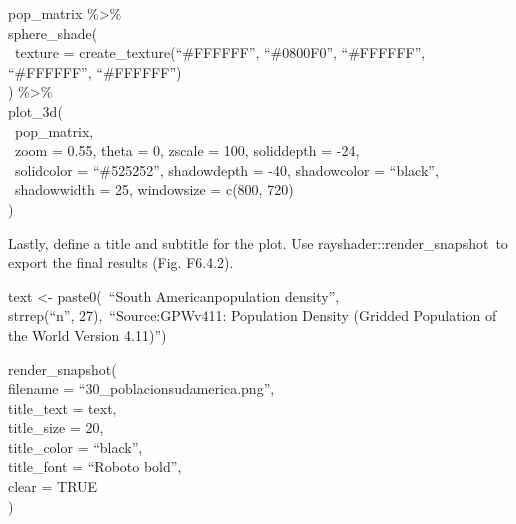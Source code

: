 \documentclass[
  letterpaper,
  DIV=11,
  numbers=noendperiod]{scrreprt}
\begin{document}
pop\_matrix \%\textgreater\%\\
\hspace*{0.333em}sphere\_shade(\\
\hspace*{0.333em} ~texture = create\_texture(``\#FFFFFF'', ``\#0800F0'',
``\#FFFFFF'', ``\#FFFFFF'', ``\#FFFFFF'')\\
\hspace*{0.333em}) \%\textgreater\%\\
\hspace*{0.333em}plot\_3d(\\
\hspace*{0.333em} ~pop\_matrix,\\
\hspace*{0.333em} ~zoom = 0.55, theta = 0, zscale = 100, soliddepth =
-24,\\
\hspace*{0.333em} ~solidcolor = ``\#525252'', shadowdepth = -40,
shadowcolor = ``black'',\\
\hspace*{0.333em} ~shadowwidth = 25, windowsize = c(800, 720)\\
\hspace*{0.333em})

Lastly, define a title and subtitle for the plot. Use
rayshader::render\_snapshot~to export the final results (Fig. F6.4.2).

text \textless- paste0(~``South Americanpopulation density'',\\
\hspace*{0.333em}strrep(``n'', 27),~``Source:GPWv411: Population Density
(Gridded Population of the World Version 4.11)'')

render\_snapshot(\\
\hspace*{0.333em}filename = ``30\_poblacionsudamerica.png'',\\
\hspace*{0.333em}title\_text = text,\\
\hspace*{0.333em}title\_size = 20,\\
\hspace*{0.333em}title\_color = ``black'',\\
\hspace*{0.333em}title\_font = ``Roboto bold'',\\
\hspace*{0.333em}clear = TRUE\\
)
\end{document}
